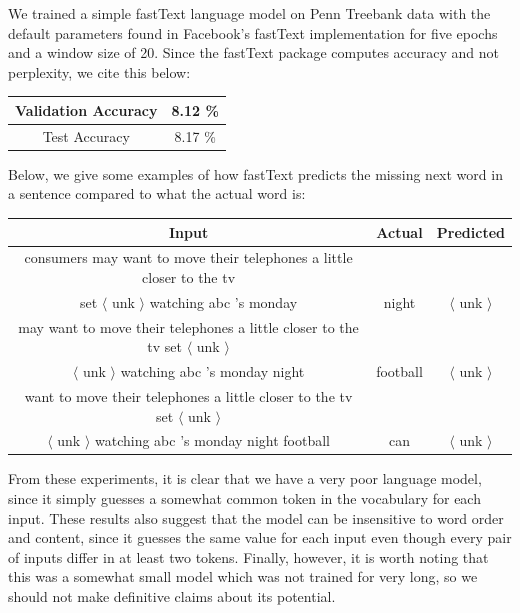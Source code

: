 \documentclass[a4paper]{article}
\begin{document}
\newline
\newline
We trained a simple fastText language model on Penn Treebank data with the default parameters found in Facebook's fastText implementation for five epochs and a window size of 20. Since the fastText package computes accuracy and not perplexity, we cite this below:

\begin{center}
\begin{tabular}{ |c|c| } 
 \hline
 Validation Accuracy & 8.12 \% \\ \hline
 Test Accuracy & 8.17 \% \\
 \hline
\end{tabular}
\end{center}

Below, we give some examples of how fastText predicts the missing next word in a sentence compared to what the actual word is:

\begin{center}
\begin{tabular}{ |c|c|c|} 
 \hline
Input & Actual & Predicted \\ \hline
consumers may want to move their telephones a little closer to the tv \\ set $\langle$ unk $\rangle$ watching abc 's monday & night & $\langle$ unk $\rangle$ \\ \hline
may want to move their telephones a little closer to the tv set $\langle$ unk $\rangle$ \\ $\langle$ unk $\rangle$ watching abc 's monday night & football & $\langle$ unk $\rangle$ \\ \hline
want to move their telephones a little closer to the tv set $\langle$ unk $\rangle$ \\ $\langle$ unk $\rangle$ watching abc 's monday night football & can & $\langle$ unk $\rangle$ \\ \hline
\end{tabular}
\end{center}

From these experiments, it is clear that we have a very poor language model, since it simply guesses a somewhat common token in the vocabulary for each input. These results also suggest that the model can be insensitive to word order and content, since it guesses the same value for each input even though every pair of inputs differ in at least two tokens. Finally, however, it is worth noting that this was a somewhat small model which was not trained for very long, so we should not make definitive claims about its potential.
\end{document}
